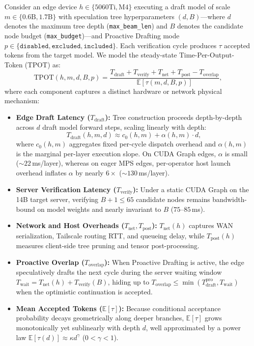 \documentclass[10pt,conference]{IEEEtran}
\begin{document}
Consider an edge device $h \in \{\text{5060Ti}, \text{M4}\}$ executing a draft model of scale $m \in \{0.6\text{B}, 1.7\text{B}\}$ with speculation tree hyperparameters $(d, B)$---where $d$ denotes the maximum tree depth (\texttt{max\_beam\_len}) and $B$ denotes the candidate node budget (\texttt{max\_budget})---and Proactive Drafting mode $p \in \{\texttt{disabled}, \texttt{excluded}, \texttt{included}\}$. Each verification cycle produces $\tau$ accepted tokens from the target model. We model the steady-state Time-Per-Output-Token (TPOT) as:
\begin{equation}
  \mathrm{TPOT}(h,m,d,B,p) = \frac{T_{\mathrm{draft}} + T_{\mathrm{verify}} + T_{\mathrm{net}} + T_{\mathrm{post}} - T_{\mathrm{overlap}}}{\mathbb{E}[\tau(m, d, B, p)]},
  \label{eq:tpot}
\end{equation}
where each component captures a distinct hardware or network physical mechanism:
\begin{itemize}
  \item \textbf{Edge Draft Latency ($T_{\mathrm{draft}}$):} Tree construction proceeds depth-by-depth across $d$ draft model forward steps, scaling linearly with depth:
  \begin{equation*}
    T_{\mathrm{draft}}(h, m, d) \approx c_0(h, m) + \alpha(h, m)\cdot d,
  \end{equation*}
  where $c_0(h, m)$ aggregates fixed per-cycle dispatch overhead and $\alpha(h, m)$ is the marginal per-layer execution slope. On CUDA Graph edges, $\alpha$ is small ($\sim 22$\,ms/layer), whereas on eager MPS edges, per-operator host launch overhead inflates $\alpha$ by nearly $6\times$ ($\sim 130$\,ms/layer).
  \item \textbf{Server Verification Latency ($T_{\mathrm{verify}}$):} Under a static CUDA Graph on the 14B target server, verifying $B+1 \le 65$ candidate nodes remains bandwidth-bound on model weights and nearly invariant to $B$ ($75$--$85$\,ms).
  \item \textbf{Network and Host Overheads ($T_{\mathrm{net}}, T_{\mathrm{post}}$):} $T_{\mathrm{net}}(h)$ captures WAN serialization, Tailscale routing RTT, and queueing delay, while $T_{\mathrm{post}}(h)$ measures client-side tree pruning and tensor post-processing.
  \item \textbf{Proactive Overlap ($T_{\mathrm{overlap}}$):} When Proactive Drafting is active, the edge speculatively drafts the next cycle during the server waiting window $T_{\mathrm{wait}} = T_{\mathrm{net}}(h) + T_{\mathrm{verify}}(B)$, hiding up to $T_{\mathrm{overlap}} \le \min(T_{\mathrm{draft}}^{\mathrm{pro}}, T_{\mathrm{wait}})$ when the optimistic continuation is accepted.
  \item \textbf{Mean Accepted Tokens ($\mathbb{E}[\tau]$):} Because conditional acceptance probability decays geometrically along deeper branches, $\mathbb{E}[\tau]$ grows monotonically yet sublinearly with depth $d$, well approximated by a power law $\mathbb{E}[\tau(d)] \approx \kappa d^{\gamma}$ ($0 < \gamma < 1$).
\end{itemize}
\end{document}
